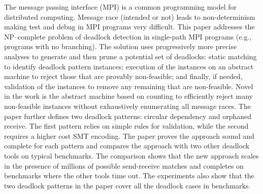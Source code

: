 The message passing interface (MPI) is a common programming model for distributed computing. Message race (intended or not) leads to non-determinism making test and debug in MPI programs very difficult. This paper addresses the NP--complete problem of deadlock detection in single-path MPI programs (e.g., programs with no branching). The solution uses progressively more precise analyses to generate and then prune a potential set of deadlocks: static matching to identify deadlock pattern instances; execution of the instances on an abstract machine to reject those that are provably non-feasible; and finally, if needed, validation of the instances to remove any remaining that are non-feasible. Novel in the work is the abstract machine based on counting to efficiently reject many non-feasible instances without exhaustively enumerating all message races.  The paper further defines two deadlock patterns: circular dependency and orphaned receive. The first pattern relies on simple rules for validation, while the second requires a higher cost SMT encoding. The paper proves the approach sound and complete for each pattern and compares the approach with two other deadlock tools on typical benchmarks. The comparison shows that the new approach scales in the presence of millions of possible send-receive matches and completes on benchmarks where the other tools time out. The experiments also show that the two deadlock patterns in the paper cover all the deadlock cases in benchmarks. 
